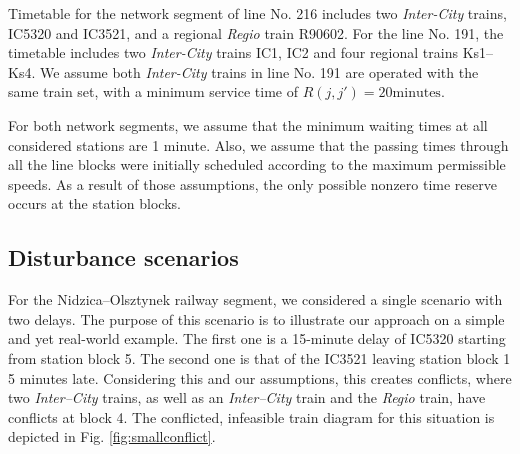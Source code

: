 Timetable for the network segment of line No. 216 includes two \emph{Inter-City} trains,
IC5320 and IC3521, and a regional \emph{Regio} train R90602. For the line No. 191,
the timetable includes two \emph{Inter-City} trains IC1, IC2 and four regional trains
Ks1--Ks4. We assume both \emph{Inter-City} trains in line No. 191 are operated with the same
train set, with a minimum service time of $R(j,j') = 20\mbox{minutes}$.

For both network segments, we assume that the minimum waiting times at all
considered stations are 1 minute. Also, we assume that the passing times
through all the line blocks were initially scheduled according to the maximum
permissible speeds. As a result of those assumptions, the only possible nonzero
time reserve occurs at the station blocks.

\subsection{Disturbance scenarios}

For the Nidzica--Olsztynek railway segment, we considered a single scenario with two delays.
The purpose of this scenario is to illustrate our approach on a simple and yet real-world example.
The first
one is a 15-minute delay of IC5320 starting from station block 5. The second one is
that of the IC3521 leaving station block 1 5 minutes late. Considering this and
our assumptions, this creates conflicts, where two \emph{Inter--City} trains,
as well as an \emph{Inter--City} train and the \emph{Regio} train, have conflicts at
block 4. The conflicted, infeasible train diagram for this situation is
depicted in Fig. \ref{fig:smallconflict}.

